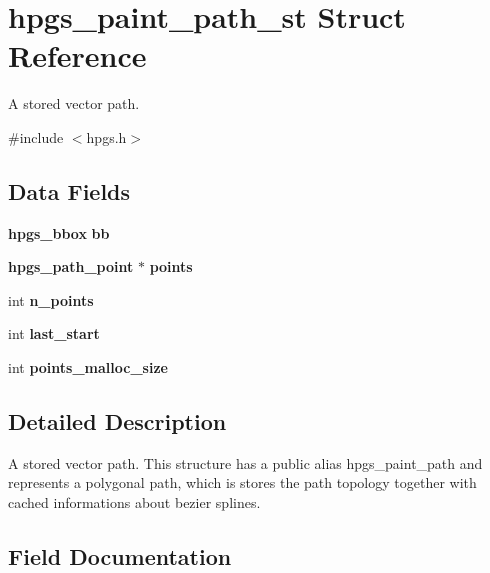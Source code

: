 \section{hpgs\_\-paint\_\-path\_\-st Struct Reference}
\label{structhpgs__paint__path__st}


A stored vector path.  




{\ttfamily \#include $<$hpgs.h$>$}

\subsection*{Data Fields}
\begin{DoxyCompactItemize}
\item 
{\bf hpgs\_\-bbox} {\bfseries bb}\label{structhpgs__paint__path__st_af4ae3fb2b6fd1725377c0399b8506b23}

\end{DoxyCompactItemize}
\begin{Indent}{\bf }\par
{\em \label{_amgrpd41d8cd98f00b204e9800998ecf8427e}
 }\begin{DoxyCompactItemize}
\item 
{\bf hpgs\_\-path\_\-point} $\ast$ {\bf points}
\item 
int {\bfseries n\_\-points}\label{structhpgs__paint__path__st_a3180496eb7ad6dd7bd9a84a6393f9ea9}

\item 
int {\bfseries last\_\-start}\label{structhpgs__paint__path__st_ab74ad95c8195e77194d3a79191823be0}

\item 
int {\bfseries points\_\-malloc\_\-size}\label{structhpgs__paint__path__st_ad251d2fedecc7e918c83cfd05d4fb358}

\end{DoxyCompactItemize}
\end{Indent}


\subsection{Detailed Description}
A stored vector path. This structure has a public alias {\ttfamily hpgs\_\-paint\_\-path} and represents a polygonal path, which is stores the path topology together with cached informations about bezier splines. 

\subsection{Field Documentation}
